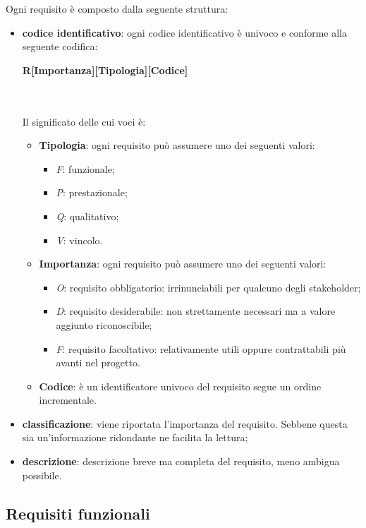 Ogni requisito è composto dalla seguente struttura:
\begin{itemize}
	\item \textbf{codice identificativo}: ogni codice identificativo è univoco e conforme alla seguente codifica:\\
	\centerline{\textbf{R[Importanza][Tipologia][Codice]}} \\ \\
	Il significato delle cui voci è:
	\begin{itemize}
		\item \textbf{Tipologia}: ogni requisito può assumere uno dei seguenti valori:
		\begin{itemize}
			\item \textit{F}: funzionale;
			\item \textit{P}: prestazionale;
			\item \textit{Q}: qualitativo;
			\item \textit{V}: vincolo.
		\end{itemize}
		\item \textbf{Importanza}: ogni requisito può assumere uno dei seguenti valori:
		\begin{itemize}
			\item \textit{O}: requisito obbligatorio: irrinunciabili per qualcuno degli stakeholder;
			\item \textit{D}: requisito desiderabile: non strettamente necessari ma  a valore aggiunto riconoscibile;
			\item \textit{F}: requisito facoltativo: relativamente utili oppure contrattabili più avanti nel progetto.	
		\end{itemize}
		\item \textbf{Codice}: è un identificatore univoco del requisito segue un ordine incrementale.
	\end{itemize}
	\item \textbf{classificazione}: viene riportata l'importanza del requisito. Sebbene questa sia un'informazione ridondante ne facilita la lettura;
	\item \textbf{descrizione}: descrizione breve ma completa del requisito, meno ambigua possibile.
\end{itemize}
\renewcommand{\arraystretch}{1.5}



\subsection{Requisiti funzionali}


